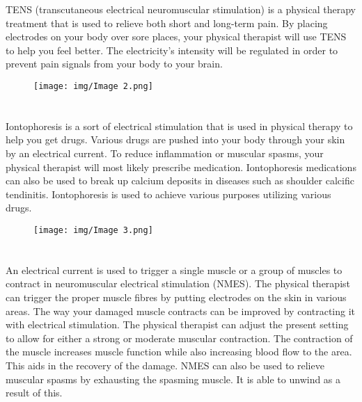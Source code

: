 \documentclass[11pt]{article}
\begin{document}
 TENS (transcutaneous electrical neuromuscular stimulation) is a physical therapy treatment that is used to relieve both short and long-term pain. By placing electrodes on your body over sore places, your physical therapist will use TENS to help you feel better. The electricity's intensity will be regulated in order to prevent pain signals from your body to your brain.
\begin{figure}[H]
    \centering
    \texttt{[image: img/Image 2.png]}
    \caption{}
    \label{fig:bad_images}
\end{figure}
\section{}
 Iontophoresis is a sort of electrical stimulation that is used in physical therapy to help you get drugs. Various drugs are pushed into your body through your skin by an electrical current. To reduce inflammation or muscular spasms, your physical therapist will most likely prescribe medication. Iontophoresis medications can also be used to break up calcium deposits in diseases such as shoulder calcific tendinitis. Iontophoresis is used to achieve various purposes utilizing various drugs.

\begin{figure}[H]
    \centering
    \texttt{[image: img/Image 3.png]}
    \caption{}
    \label{fig:bad_images}
\end{figure}

\section{}
An electrical current is used to trigger a single muscle or a group of muscles to contract in neuromuscular electrical stimulation (NMES). The physical therapist can trigger the proper muscle fibres by putting electrodes on the skin in various areas.
             The way your damaged muscle contracts can be improved by contracting it with electrical stimulation. The physical therapist can adjust the present setting to allow for either a strong or moderate muscular contraction. The contraction of the muscle increases muscle function while also increasing blood flow to the area. This aids in the recovery of the damage. NMES can also be used to relieve muscular spasms by exhausting the spasming muscle. It is able to unwind as a result of this.
\end{document}
